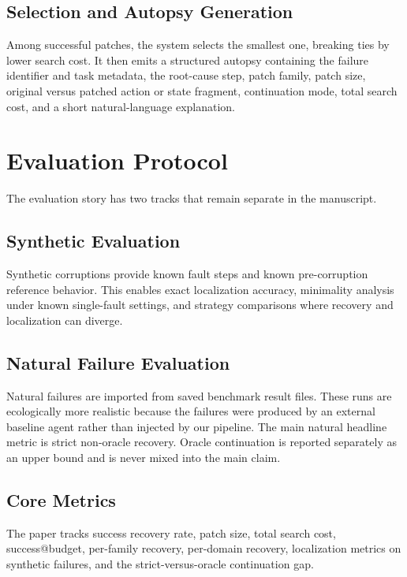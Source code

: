 \documentclass[11pt]{article}
\begin{document}
\subsection{Selection and Autopsy Generation}

Among successful patches, the system selects the smallest one, breaking ties by
lower search cost. It then emits a structured autopsy containing the failure
identifier and task metadata, the root-cause step, patch family, patch size,
original versus patched action or state fragment, continuation mode, total
search cost, and a short natural-language explanation.

\section{Evaluation Protocol}

The evaluation story has two tracks that remain separate in the manuscript.

\subsection{Synthetic Evaluation}

Synthetic corruptions provide known fault steps and known pre-corruption
reference behavior. This enables exact localization accuracy, minimality
analysis under known single-fault settings, and strategy comparisons where
recovery and localization can diverge.

\subsection{Natural Failure Evaluation}

Natural failures are imported from saved benchmark result files. These runs are
ecologically more realistic because the failures were produced by an external
baseline agent rather than injected by our pipeline. The main natural headline
metric is strict non-oracle recovery. Oracle continuation is reported
separately as an upper bound and is never mixed into the main claim.

\subsection{Core Metrics}

The paper tracks success recovery rate, patch size, total search cost,
success@budget, per-family recovery, per-domain recovery, localization metrics
on synthetic failures, and the strict-versus-oracle continuation gap.
\end{document}
